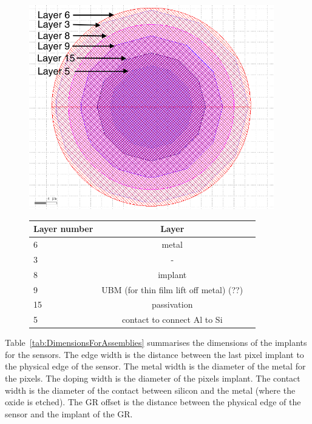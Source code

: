 \begin{figure}[htbp]
  \centering
  \begin{minipage}[t]{.4\textwidth}
    \centering
    \vspace{0pt}
    \includegraphics[width=0.95\textwidth]{figures/ActiveEdge/pixelLayout_withLayers.png}
    \caption{}
    \label{fig:PixelLayout}
  \end{minipage}
  \hfill
  \begin{minipage}[t]{.56\textwidth}
    \centering
    \vspace{0pt}
    \label{tab:PixelStackDimensions}
    \begin{tabular}{l c c}
      \toprule
      Layer number & Layer \\
      \midrule
      6 & metal\\
      3 & - \\
      8 & implant \\
      9 & UBM (for thin film lift off metal) (??) \\
      15 & passivation \\
      5 & contact to connect Al to Si \\
      \bottomrule
    \end{tabular}
  \end{minipage}
\end{figure}

Table~\ref{tab:DimensionsForAssemblies} summarises the dimensions of
the implants for the sensors. The edge width is the distance between
the last pixel implant to the physical edge of the sensor. The metal
width is the diameter of the metal for the pixels. The doping width is
the diameter of the pixels implant. The contact width is the diameter
of the contact between silicon and the metal (where the oxide is
etched). The GR offset is the distance between the physical edge of
the sensor and the implant of the GR.

